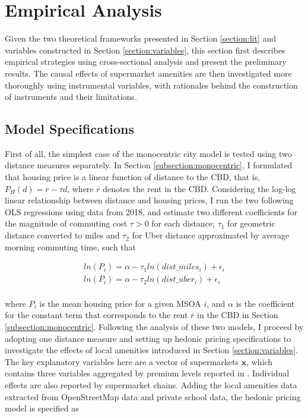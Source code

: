 \documentclass{article}
\begin{document}
\section{Empirical Analysis} \label{section:model}
Given the two theoretical frameworks presented in Section \ref{section:lit} and variables constructed in Section \ref{section:variables}, this section first describes empirical strategies using cross-sectional analysis and present the preliminary results. The causal effects of supermarket amenities are then investigated more thoroughly using instrumental variables, with rationales behind the construction of instruments and their limitations.

\subsection{Model Specifications} \label{subsection:specifications}
First of all, the simplest case of the monocentric city model is tested using two distance measures separately. In Section \ref{subsection:monocentric}, I formulated that housing price is a linear function of distance to the CBD, that is, $P_H(d) = \overline{r} - \tau d$, where $\overline{r}$ denotes the rent in the CBD. Considering the log-log linear relationship between distance and housing prices, I run the two following OLS regressions using data from 2018, and estimate two different coefficients for the magnitude of commuting cost $\tau > 0$ for each distance; $\tau_1$ for geometric distance converted to miles and $\tau_2$ for Uber distance approximated by average morning commuting time, such that

\begin{gather*}
ln(P_i) = \alpha - \tau_1 ln(dist\_miles_i) + \epsilon_i \\
ln(P_i) = \alpha - \tau_2 ln(dist\_uber_i) + \epsilon_i
\end{gather*}
\\
where $P_i$ is the mean housing price for a given MSOA $i$, and $\alpha$ is the coefficient for the constant term that corresponds to the rent $\overline{r}$ in the CBD in Section \ref{subsection:monocentric}. Following the analysis of these two models, I proceed by adopting one distance measure and setting up hedonic pricing specifications to investigate the effects of local amenities introduced in Section \ref{section:variables}. The key explanatory variables here are a vector of supermarkets $\boldsymbol{x}$, which contains three variables aggregated by premium levels reported in \citet{LloydsBank2016LivingHome}. Individual effects are also reported by supermarket chains. Adding the local amenities data extracted from OpenStreetMap data and private school data, the hedonic pricing model is specified as
\end{document}
